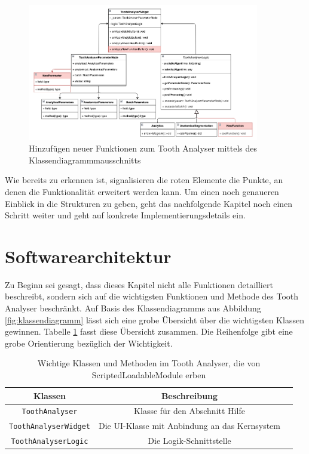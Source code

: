 \begin{figure}[h]
	\centering
	\includegraphics[width=0.9\textwidth]{
		img/tooth_analyser_class_diagram_new.png
	}
	\caption{Hinzufügen neuer Funktionen zum Tooth Analyser mittels des
	Klassendiagrammmausschnitts}
	\label{fig:klassendiagramm_new}
\end{figure}

Wie bereits zu erkennen ist, signalisieren die roten Elemente die Punkte, an
denen die Funktionalität erweitert werden kann. Um einen noch genaueren Einblick
in die Strukturen zu geben, geht das nachfolgende Kapitel noch einen Schritt
weiter und geht auf konkrete Implementierungsdetails ein.

\pagebreak

\section{Softwarearchitektur}
\label{sec:technische_umsetzung} Zu Beginn sei gesagt, dass dieses Kapitel nicht
alle Funktionen detailliert beschreibt, sondern sich auf die wichtigsten Funktionen
und Methode des Tooth Analyser beschränkt. Auf Basis des Klassendiagramms aus
Abbildung \ref{fig:klassendiagramm} lässt sich eine grobe Übersicht über die
wichtigsten Klassen gewinnen. Tabelle \ref{tab:methoden_klassen} fasst diese Übersicht
zusammen. Die Reihenfolge gibt eine grobe Orientierung bezüglich der Wichtigkeit.

\begin{table}[h]
	\centering
	\begin{tabular}{|c|c|c|}
		\hline
		\textbf{Klassen}             & \textbf{Beschreibung}                              \\
		\hline
		\texttt{ToothAnalyser}       & Klasse für den Abschnitt Hilfe                     \\
		\hline
		\texttt{ToothAnalyserWidget} & Die \ac{UI}-Klasse mit Anbindung an das Kernsystem \\
		\hline
		\texttt{ToothAnalyserLogic}  & Die Logik-Schnittstelle                            \\
		\hline
	\end{tabular}
	\caption{Wichtige Klassen und Methoden im Tooth Analyser, die von ScriptedLoadableModule
	erben}
	\label{tab:methoden_klassen}
\end{table}

